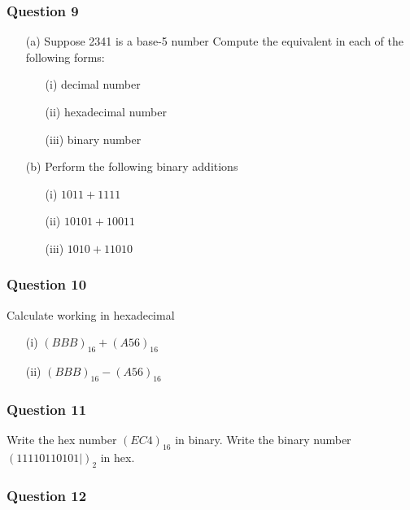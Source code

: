 \documentclass[]{report}
\begin{document}
\subsubsection*{Question 9}

\begin{itemize}
\item[(a)] Suppose 2341 is a base-5 number
Compute the equivalent in each of the following forms:
\begin{itemize}
\item[(i)] decimal number
\item[(ii)] hexadecimal number
\item[(iii)] binary number
\end{itemize}
\item[(b)] Perform the following binary additions
\begin{itemize}
\item[(i)] $1011+ 1111$
\item[(ii)] $10101  + 10011$
\item[(iii)] $1010 + 11010$
\end{itemize}
\end{itemize}

\subsubsection*{Question 10}

Calculate working in hexadecimal
\begin{itemize}
\item[(i)] $(BBB)_{16} + (A56)_{16}$
\item[(ii)] $(BBB)_{16} - (A56)_{16}$
\end{itemize} 


\subsubsection*{Question 11}

Write the hex number $(EC4)_{16}$ in binary.
Write the binary number $(11110110101|)_2$ in hex.
\subsubsection*{Question 12}
\end{document}
